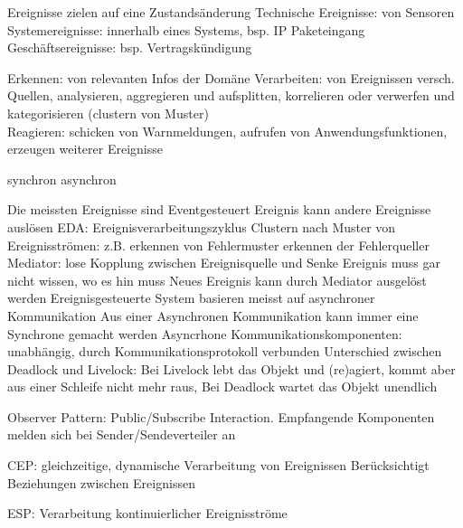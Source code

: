 \documentclass[ngerman,a4paper,12pt]{scrreprt}
\begin{document}
\ul
	\li Ereignisse zielen auf eine Zustandsänderung
	\li Technische Ereignisse: von Sensoren
	\li Systemereignisse: innerhalb eines Systems, bsp. IP Paketeingang
	\li Geschäftsereignisse: bsp. Vertragskündigung
\ulE

\ul
	\li Erkennen: von relevanten Infos der Domäne
	\li Verarbeiten: von Ereignissen versch. Quellen, analysieren, aggregieren und aufsplitten, korrelieren oder verwerfen und kategorisieren (clustern von Muster)\\
	\li Reagieren: schicken von Warnmeldungen, aufrufen von Anwendungsfunktionen, erzeugen weiterer Ereignisse
\ulE


\ul
	\li synchron
	\li asynchron
\ulE

\ul
	\li Die meissten Ereignisse sind Eventgesteuert
	\li Ereignis kann andere Ereignisse auslösen
	\li EDA: Ereignisverarbeitungszyklus
	\li Clustern nach Muster von Ereignisströmen: z.B. erkennen von Fehlermuster \ra erkennen der Fehlerqueller
	\li Mediator: lose Kopplung zwischen Ereignisquelle und Senke \ra Ereignis muss gar nicht wissen, wo es hin muss 
	\li Neues Ereignis kann durch Mediator ausgelöst werden
	\li Ereignisgesteuerte System basieren meisst auf asynchroner Kommunikation
	\li Aus einer Asynchronen Kommunikation kann immer eine Synchrone gemacht werden
	\li Asyncrhone Kommunikationskomponenten: unabhängig, durch Kommunikationsprotokoll verbunden
	\li Unterschied zwischen Deadlock und Livelock: Bei Livelock lebt das Objekt und (re)agiert, kommt aber aus einer Schleife nicht mehr raus, Bei Deadlock wartet das Objekt unendlich
\ulE


\ul
	\li Observer Pattern: Public/Subscribe Interaction. Empfangende Komponenten melden sich bei Sender/Sendeverteiler an
\ulE

CEP:
\ul
	\li gleichzeitige, dynamische Verarbeitung von Ereignissen
	\li Berücksichtigt Beziehungen zwischen Ereignissen
\ulE

ESP: Verarbeitung kontinuierlicher Ereignisströme
\end{document}
